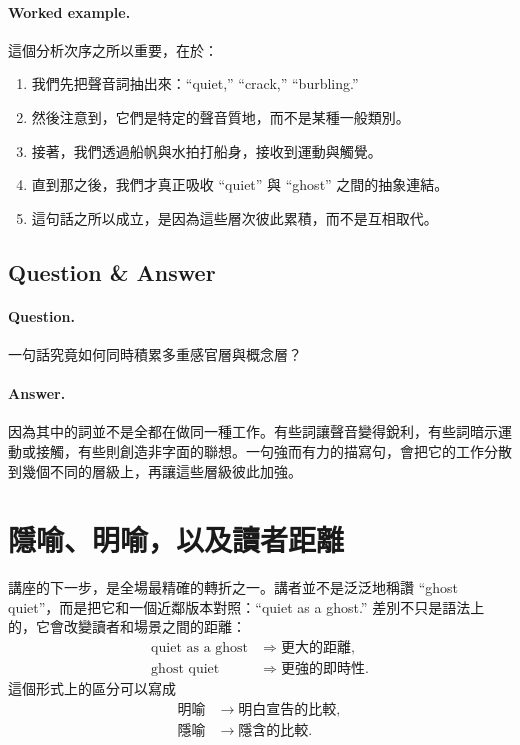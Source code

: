 \paragraph{Worked example.} 這個分析次序之所以重要，在於：
\begin{enumerate}
\item 我們先把聲音詞抽出來：``quiet,'' ``crack,'' ``burbling.''
\item 然後注意到，它們是特定的聲音質地，而不是某種一般類別。
\item 接著，我們透過船帆與水拍打船身，接收到運動與觸覺。
\item 直到那之後，我們才真正吸收 ``quiet'' 與 ``ghost'' 之間的抽象連結。
\item 這句話之所以成立，是因為這些層次彼此累積，而不是互相取代。
\end{enumerate}

\subsection{Question \& Answer}

\paragraph{Question.} 一句話究竟如何同時積累多重感官層與概念層？

\paragraph{Answer.} 因為其中的詞並不是全都在做同一種工作。有些詞讓聲音變得銳利，有些詞暗示運動或接觸，有些則創造非字面的聯想。一句強而有力的描寫句，會把它的工作分散到幾個不同的層級上，再讓這些層級彼此加強。

\section{隱喻、明喻，以及讀者距離}

講座的下一步，是全場最精確的轉折之一。講者並不是泛泛地稱讚 ``ghost quiet''，而是把它和一個近鄰版本對照：``quiet as a ghost.'' 差別不只是語法上的，它會改變讀者和場景之間的距離：
\begin{align}
\text{quiet as a ghost} &\Rightarrow \text{更大的距離},\\
\text{ghost quiet} &\Rightarrow \text{更強的即時性}.
\end{align}
這個形式上的區分可以寫成
\begin{align}
\text{明喻} &\to \text{明白宣告的比較},\\
\text{隱喻} &\to \text{隱含的比較}.
\end{align}

